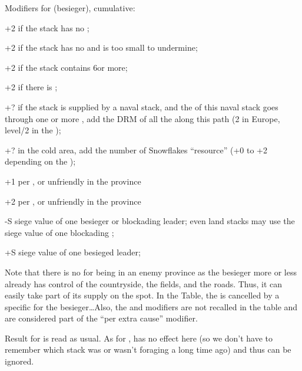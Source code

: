 Modifiers for  (besieger), cumulative:
\begin{modlist}
\item[+2] if the stack has no \LoS;
\item[+2] if the stack has no \LoS and is too small to undermine;
\item[+2] if the stack contains 6\LD or more;
\item[+2] if there is ;
\item[+?] if the stack is supplied by a naval stack, and the \LoS of this
  naval stack goes through one or more \StraitFort, add the DRM of all the
  \StraitFort along this path (2 in Europe, level/2 in the \ROTW);
\item[+?] in the \ROTW cold area, add the number of Snowflakes ``resource''
  (+0 to +2 depending on the \Area);
\item[+1] per \PILLAGE\facemoins, \REVOLT\facemoins or unfriendly
  \REBELLION\facemoins in the province
\item[+2] per \PILLAGE\faceplus, \REVOLT\faceplus or unfriendly
  \REBELLION\faceplus in the province
\item[-S] siege value of one besieger or blockading leader; even land stacks
  may use the siege value of one blockading \LeaderA;
\item[+S] siege value of one besieged leader;
\end{modlist}

Note that there is no  for being in an enemy province as the
besieger more or less already has control of the countryside, the fields,
and the roads. Thus, it can easily take part of its supply on the spot. In the
Table, the  is cancelled by a specific  for the
besieger\ldots Also, the  and 
modifiers are not recalled in the table and are considered part of the ``per
extra cause'' modifier.

Result for  is read as usual. As for ,  has no effect here (so we don't have to
remember which stack was or wasn't foraging a long time ago) and thus can be
ignored.

